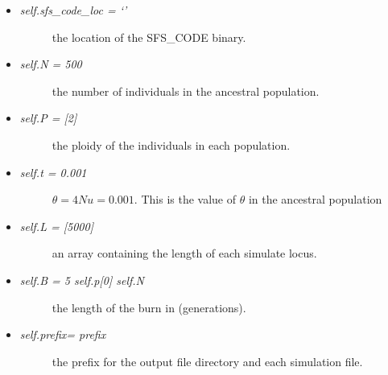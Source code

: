\documentclass[letterpaper,10pt,english]{sphinxmanual}
\begin{document}
\begin{fulllineitems}
\begin{itemize}
\begin{itemize}
\begin{description}
\end{description}

\item {} \begin{description}
\item[{\emph{self.sfs\_code\_loc = `'}   }] \leavevmode
the location of the SFS\_CODE binary.

\end{description}

\item {} \begin{description}
\item[{\emph{self.N = 500}  }] \leavevmode
the number of individuals in the ancestral population.

\end{description}

\item {} \begin{description}
\item[{\emph{self.P = {[}2{]}}  }] \leavevmode
the ploidy of the individuals in each population.

\end{description}

\item {} \begin{description}
\item[{\emph{self.t = 0.001}}] \leavevmode
\(\theta = 4Nu = 0.001\).  This is the value of 
\(\theta\) in the ancestral population

\end{description}

\item {} \begin{description}
\item[{\emph{self.L = {[}5000{]}} }] \leavevmode
an array containing the length of each simulate locus.

\end{description}

\item {} \begin{description}
\item[{\emph{self.B = 5 self.p{[}0{]} self.N} }] \leavevmode
the length of the burn in (generations).

\end{description}

\item {} \begin{description}
\item[{\emph{self.prefix= prefix} }] \leavevmode
the prefix for the output file directory and each simulation file.


\end{description}
\end{itemize}
\end{itemize}
\end{fulllineitems}
\end{document}
